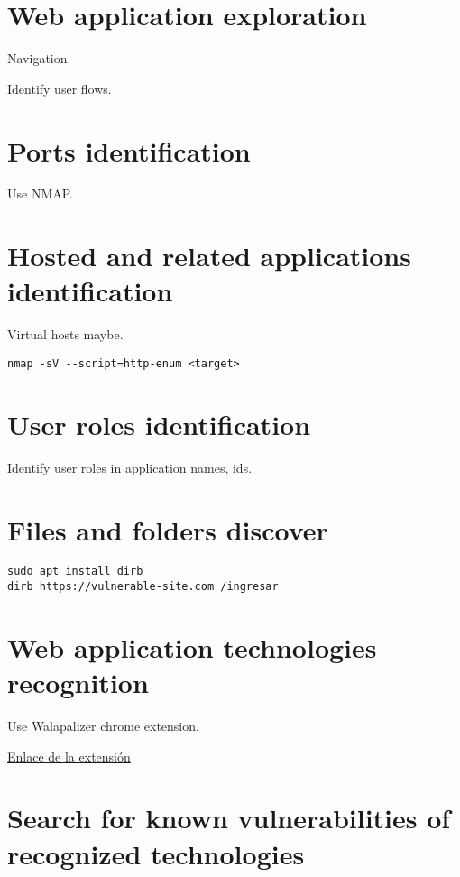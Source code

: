 \section{Web application exploration}

Navigation.

Identify user flows.

\section{Ports identification}

Use NMAP.


\section{Hosted and related applications identification}

Virtual hosts maybe.

\begin{lstlisting}[numbers=none]
nmap -sV --script=http-enum <target>
\end{lstlisting}

\section{User roles identification}

Identify user roles in application names, ids.

\section{Files and folders discover}

\begin{lstlisting}[numbers=none]
sudo apt install dirb
dirb https://vulnerable-site.com /ingresar
\end{lstlisting}

\section{Web application technologies recognition}

Use Walapalizer chrome extension.

\href{https://chrome.google.com/webstore/detail/wappalyzer-technology-pro/gppongmhjkpfnbhagpmjfkannfbllamg}{Enlace de la extensión}


\section{Search for known vulnerabilities of recognized technologies}


